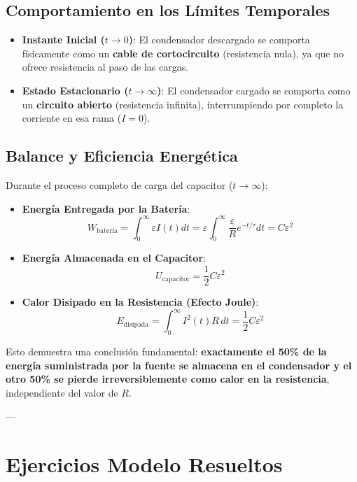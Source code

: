 \documentclass[12pt, a4paper]{article}
\begin{document}
\subsection{Comportamiento en los Límites Temporales}
\begin{itemize}
    \item \textbf{Instante Inicial ($t \to 0$)}: El condensador descargado se comporta físicamente como un \textbf{cable de cortocircuito} (resistencia nula), ya que no ofrece resistencia al paso de las cargas.
    \item \textbf{Estado Estacionario ($t \to \infty$)}: El condensador cargado se comporta como un \textbf{circuito abierto} (resistencia infinita), interrumpiendo por completo la corriente en esa rama ($I = 0$).
\end{itemize}

\subsection{Balance y Eficiencia Energética}
Durante el proceso completo de carga del capacitor ($t \to \infty$):
\begin{itemize}
    \item \textbf{Energía Entregada por la Batería}:
    \begin{equation}
        W_{\text{batería}} = \int_0^\infty \varepsilon I(t) dt = \varepsilon \int_0^\infty \frac{\varepsilon}{R} e^{-t/\tau} dt = C \varepsilon^2
    \end{equation}
    \item \textbf{Energía Almacenada en el Capacitor}:
    \begin{equation}
        U_{\text{capacitor}} = \frac{1}{2} C \varepsilon^2
    \end{equation}
    \item \textbf{Calor Disipado en la Resistencia (Efecto Joule)}:
    \begin{equation}
        E_{\text{disipada}} = \int_0^\infty I^2(t) R\, dt = \frac{1}{2} C \varepsilon^2
    \end{equation}
\end{itemize}
Esto demuestra una conclusión fundamental: \textbf{exactamente el 50\% de la energía suministrada por la fuente se almacena en el condensador y el otro 50\% se pierde irreversiblemente como calor en la resistencia}, independiente del valor de $R$.

---

\section{Ejercicios Modelo Resueltos}
\end{document}
